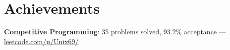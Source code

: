 \section{Achievements}
\begin{itemize}[leftmargin=0.15in, label={}]
\small{\item{
\textbf{Competitive Programming}{: 35 problems solved, 93.2\% acceptance — \href{https://leetcode.com/u/Unix69/}{\underline{leetcode.com/u/Unix69/}}}
}}
\end{itemize}